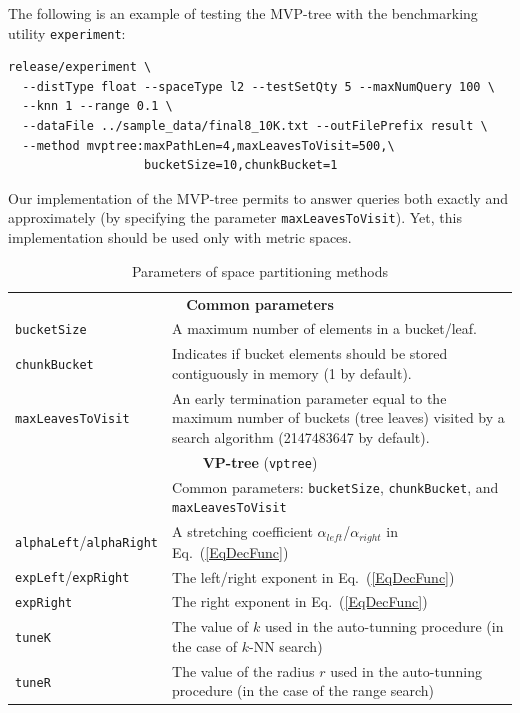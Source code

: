 \documentclass[runningheads,a4paper]{llncs}
\newcommand{\ttt}[1]{\texttt{#1}}
\newcommand{\knn}{$k$-NN }
\begin{document}
{The following is an example of testing the MVP-tree with the benchmarking utility \ttt{experiment}:
{
\footnotesize
\begin{verbatim}
release/experiment \
  --distType float --spaceType l2 --testSetQty 5 --maxNumQuery 100 \
  --knn 1 --range 0.1 \
  --dataFile ../sample_data/final8_10K.txt --outFilePrefix result \
  --method mvptree:maxPathLen=4,maxLeavesToVisit=500,\
                   bucketSize=10,chunkBucket=1
\end{verbatim}
}

Our implementation of the MVP-tree permits to answer queries both exactly and approximately (by specifying
the parameter \ttt{maxLeavesToVisit}). Yet, this implementation should be used only with metric spaces.

\begin{table}
\caption{Parameters of space partitioning methods\label{TableSpaceMethPart}}
\centering
\begin{tabular}{l@{\hspace{2mm}}p{3.5in}}
\toprule
\multicolumn{2}{c}{\textbf{Common parameters}}\\
\cmidrule(l){1-2} 
\ttt{bucketSize}    & A maximum number of elements in a bucket/leaf.    \\
\ttt{chunkBucket}   & Indicates if bucket elements should be stored contiguously in memory (1 by default).  \\
\ttt{maxLeavesToVisit}  & An early termination parameter equal to the maximum number of buckets (tree leaves) visited by a search algorithm (2147483647 by default). \\
\cmidrule(l){1-2} 
\multicolumn{2}{c}{\textbf{VP-tree} (\ttt{vptree}) \cite{Uhlmann:1991,Yianilos:1993}  } 
\\
\cmidrule(l){1-2} 
                   & Common parameters: \ttt{bucketSize}, \ttt{chunkBucket}, and \ttt{maxLeavesToVisit} \\
 \ttt{alphaLeft}/\ttt{alphaRight}   & A stretching coefficient $\alpha_{left}$/$\alpha_{right}$ in Eq.~(\ref{EqDecFunc}) \\
 \ttt{expLeft}/\ttt{expRight} & The left/right exponent in Eq.~(\ref{EqDecFunc}) \\
 \ttt{expRight}    & The right exponent in Eq.~(\ref{EqDecFunc}) \\
 \ttt{tuneK}       & The value of $k$ used in the auto-tunning procedure (in the case of \knn search) \\
 \ttt{tuneR}       & The value of the radius $r$ used in the auto-tunning procedure (in the case of the range search) \\

\end{tabular}
\end{table}}
\end{document}
